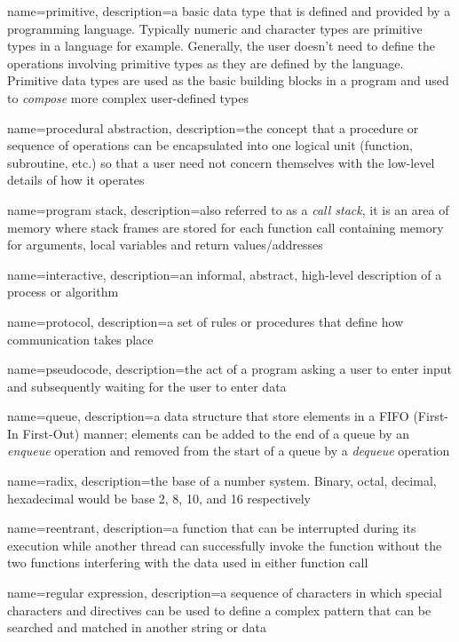 {
  name=primitive,
  description={a basic data type that is defined and provided by a programming language.  Typically numeric and character types are primitive types in a language for example.  Generally, the user doesn't need to define the operations involving primitive types as they are defined by the language.  Primitive data types are used as the basic building blocks in a program and used to \emph{compose} more complex user-defined types}
}

{
  name=procedural abstraction,
  description={the concept that a procedure or sequence of operations can be encapsulated into one logical unit (function, subroutine, etc.) so that a user need not concern themselves with the low-level details of how it operates}
}

{
  name=program stack,
  description={also referred to as a \emph{call stack}, it is an area of memory where stack frames are stored for each function call containing memory for arguments, local variables and return values/addresses}
}

{
  name=interactive,
  description={an informal, abstract, high-level description of a process or algorithm}
}

{
  name=protocol,
  description={a set of rules or procedures that define how communication takes place}
}

{
  name=pseudocode,
  description={the act of a program asking a user to enter input and subsequently waiting for the user to enter data}
}

{
  name=queue,
  description={a data structure that store elements in a FIFO (First-In First-Out) manner; elements can be added to the end of a queue by an \emph{enqueue} operation and removed from the start of a queue by a \emph{dequeue} operation}
}

{
  name=radix,
  description={the base of a number system.  Binary, octal, decimal, hexadecimal would be base 2, 8, 10, and 16 respectively}
}

{
  name=reentrant,
  description={a function that can be interrupted during its execution while another thread can successfully invoke the function without the two functions interfering with the data used in either function call}
}

{
  name=regular expression,
  description={a sequence of characters in which special characters and directives can be used to define a complex pattern that can be searched and matched in another string or data}
}

